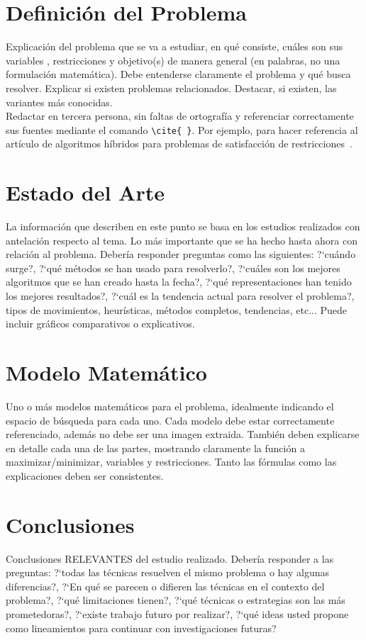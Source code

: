 \documentclass[letter, 10pt]{article}
\begin{document}
\section{Definici\'on del Problema}
Explicaci\'on del problema que se va a estudiar, en qu\'e consiste, cu\'ales son sus variables , restricciones y objetivo(s) de manera general (en palabras, no una formulaci\'on matem\'atica). Debe entenderse claramente el problema y qu\'e busca resolver.
Explicar si existen problemas relacionados.
Destacar, si existen, las variantes m\'as conocidas.\\
Redactar en tercera persona, sin faltas de ortograf\'ia y referenciar correctamente sus fuentes mediante el comando  \verb+\cite{ }+. Por ejemplo, para hacer referencia al art\'iculo de algoritmos h\'ibridos para problemas de satisfacci\'on
 de restricciones~\cite{Prosser93Hybrid}.

\section{Estado del Arte}
La informaci\'on que describen en este punto se basa en los estudios realizados con antelaci\'on respecto al tema.
Lo m\'as importante que se ha hecho hasta ahora con relaci\'on al problema. Deber\'ia responder preguntas como las siguientes:
?`cu\'ando surge?, ?`qu\'e m\'etodos se han usado para resolverlo?, ?`cu\'ales son los mejores algoritmos que se han creado hasta
la fecha?, ?`qu\'e representaciones han tenido los mejores resultados?, ?`cu\'al es la tendencia actual para resolver el problema?, tipos de movimientos, heur\'isticas, m\'etodos completos, tendencias, etc... Puede incluir gr\'aficos comparativos o explicativos.\\

\section{Modelo Matem\'atico}
Uno o m\'as modelos matem\'aticos para el problema, idealmente indicando el espacio de b\'usqueda para cada uno. Cada modelo debe estar correctamente referenciado, adem\'as no debe ser una imagen extraida. Tambi\'en deben explicarse en detalle cada una de las partes, mostrando claramente la funci\'on a maximizar/minimizar, variables y restricciones. Tanto las f\'ormulas como las explicaciones deben ser consistentes.

\section{Conclusiones}
Conclusiones RELEVANTES del estudio realizado. Deber\'ia responder a las preguntas: ?`todas las t\'ecnicas resuelven el mismo problema o hay algunas diferencias?, ?`En qu\'e se parecen o difieren las t\'ecnicas en el contexto del problema?, ?`qu\'e limitaciones tienen?, ?`qu\'e t\'ecnicas o estrategias son las m\'as prometedoras?, ?`existe trabajo futuro por realizar?, ?`qu\'e ideas usted propone como lineamientos para continuar con investigaciones futuras?
\end{document}
